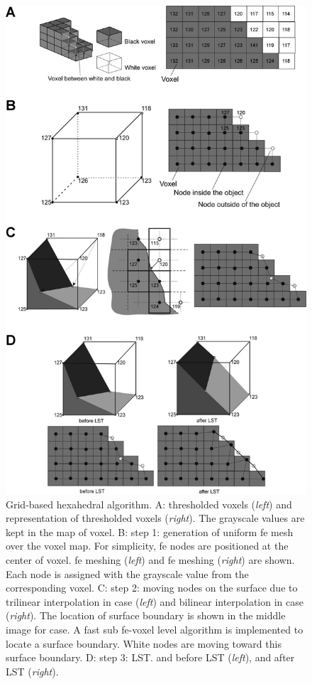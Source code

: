 \renewcommand{\imsize}{0.618\linewidth}
\begin{figure}[p]
	\centering
	\includegraphics[width=\imsize]{img/Tsuda2008/Tsuda-04}
	\caption[Grid-based hexahedral algorithm]{Grid-based hexahedral algorithm. A: \threed thresholded voxels (\textit{left}) and \twod representation of thresholded voxels (\textit{right}). The grayscale values are kept in the map of voxel. B: step 1: generation of uniform \acl{fe} mesh over the voxel map. For simplicity, \ac{fe} nodes are positioned at the center of voxel. \threed \ac{fe} meshing (\textit{left}) and \twod \ac{fe} meshing (\textit{right}) are shown. Each node is assigned with the grayscale value from the corresponding voxel. C: step 2: moving nodes on the surface due to trilinear interpolation in \threed case (\textit{left}) and bilinear interpolation in \twod case (\textit{right}). The location of surface boundary is shown in the middle image for \twod case. A fast sub \ac{fe}-voxel level algorithm is implemented to locate a surface boundary. White nodes are moving toward this surface boundary. D: step 3: \acf{LST}. \threed and \twod before \ac{LST} (\textit{left}), \threed and \twod after \ac{LST} (\textit{right}).}
	\label{fig:hexahedral}
\end{figure}

